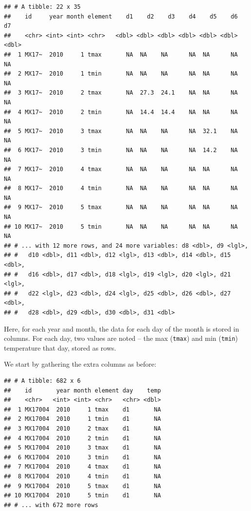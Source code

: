 \documentclass[12pt,letterpaperpaper,openany]{book}
\newenvironment{Shaded}{\begin{snugshade}}{\end{snugshade}}
\newcommand{\KeywordTok}[1]{\textcolor[rgb]{0.13,0.29,0.53}{\textbf{#1}}}
\newcommand{\NormalTok}[1]{#1}
\newcommand{\OperatorTok}[1]{\textcolor[rgb]{0.81,0.36,0.00}{\textbf{#1}}}
\newcommand{\StringTok}[1]{\textcolor[rgb]{0.31,0.60,0.02}{#1}}
\begin{document}
\begin{verbatim}
## # A tibble: 22 x 35
##    id     year month element    d1    d2    d3    d4    d5    d6    d7
##    <chr> <int> <int> <chr>   <dbl> <dbl> <dbl> <dbl> <dbl> <dbl> <dbl>
##  1 MX17~  2010     1 tmax       NA  NA    NA      NA  NA      NA    NA
##  2 MX17~  2010     1 tmin       NA  NA    NA      NA  NA      NA    NA
##  3 MX17~  2010     2 tmax       NA  27.3  24.1    NA  NA      NA    NA
##  4 MX17~  2010     2 tmin       NA  14.4  14.4    NA  NA      NA    NA
##  5 MX17~  2010     3 tmax       NA  NA    NA      NA  32.1    NA    NA
##  6 MX17~  2010     3 tmin       NA  NA    NA      NA  14.2    NA    NA
##  7 MX17~  2010     4 tmax       NA  NA    NA      NA  NA      NA    NA
##  8 MX17~  2010     4 tmin       NA  NA    NA      NA  NA      NA    NA
##  9 MX17~  2010     5 tmax       NA  NA    NA      NA  NA      NA    NA
## 10 MX17~  2010     5 tmin       NA  NA    NA      NA  NA      NA    NA
## # ... with 12 more rows, and 24 more variables: d8 <dbl>, d9 <lgl>,
## #   d10 <dbl>, d11 <dbl>, d12 <lgl>, d13 <dbl>, d14 <dbl>, d15 <dbl>,
## #   d16 <dbl>, d17 <dbl>, d18 <lgl>, d19 <lgl>, d20 <lgl>, d21 <lgl>,
## #   d22 <lgl>, d23 <dbl>, d24 <lgl>, d25 <dbl>, d26 <dbl>, d27 <dbl>,
## #   d28 <dbl>, d29 <dbl>, d30 <dbl>, d31 <dbl>
\end{verbatim}

Here, for each year and month, the data for each day of the month is stored in columns. For each
day, two values are noted -- the max (\texttt{tmax}) and min (\texttt{tmin}) temperature that day, stored as rows.

We start by gathering the extra columns as before:

\begin{Shaded}
\end{Shaded}

\begin{verbatim}
## # A tibble: 682 x 6
##    id       year month element day    temp
##    <chr>   <int> <int> <chr>   <chr> <dbl>
##  1 MX17004  2010     1 tmax    d1       NA
##  2 MX17004  2010     1 tmin    d1       NA
##  3 MX17004  2010     2 tmax    d1       NA
##  4 MX17004  2010     2 tmin    d1       NA
##  5 MX17004  2010     3 tmax    d1       NA
##  6 MX17004  2010     3 tmin    d1       NA
##  7 MX17004  2010     4 tmax    d1       NA
##  8 MX17004  2010     4 tmin    d1       NA
##  9 MX17004  2010     5 tmax    d1       NA
## 10 MX17004  2010     5 tmin    d1       NA
## # ... with 672 more rows
\end{verbatim}
\end{document}
